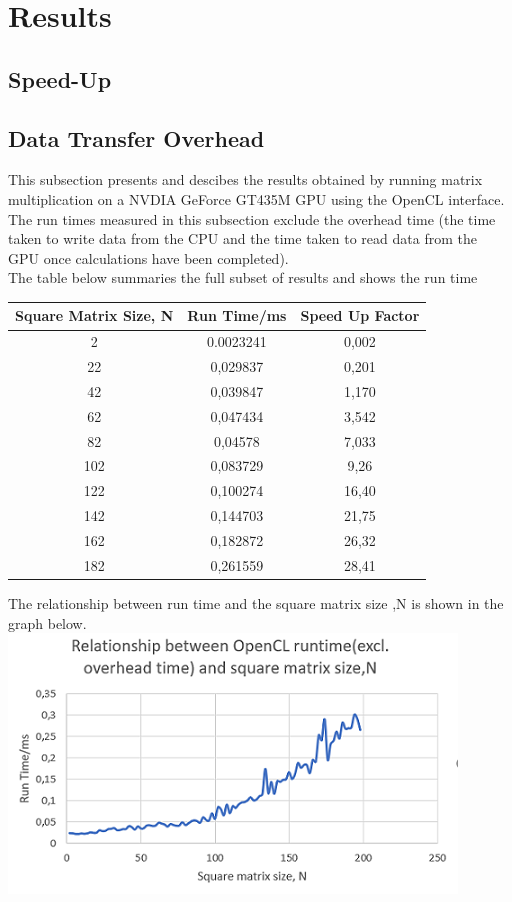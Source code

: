\section{Results}


\subsection{Speed-Up}

\subsection{Data Transfer Overhead}
This subsection presents and descibes the results obtained by running matrix multiplication on a NVDIA GeForce GT435M GPU using the OpenCL interface. The run times measured in this subsection exclude the overhead time (the time taken to write data from the CPU and the time taken to read data from the GPU once calculations have been completed). 
\\
The table below summaries the full subset of results and shows the run time 
\begin{center}
	\begin{tabular}{||c c c||} 
		\hline
		Square Matrix Size, N &  Run Time/ms & Speed Up Factor \\ [0.1ex] 
		\hline\hline
		2 &	0.0023241 & 0,002\\
		\hline
		22 & 0,029837 & 0,201\\
		\hline
		42 & 0,039847 & 1,170\\
		\hline
		62 & 0,047434 & 3,542\\
		\hline
		82 & 0,04578 & 7,033\\
		\hline
		102	& 0,083729 & 9,26\\
		\hline
	    122	& 0,100274 & 16,40\\
		\hline
		142	& 0,144703 & 21,75\\
		\hline
		162	& 0,182872 & 26,32\\
		\hline
		182	& 0,261559 & 28,41\\
		\hline
		
	\end{tabular}
\end{center}

The relationship between run time and the square matrix size ,N is shown in the graph below.
\\
\vspace{2mm}
\includegraphics{Figures/part2.PNG}


